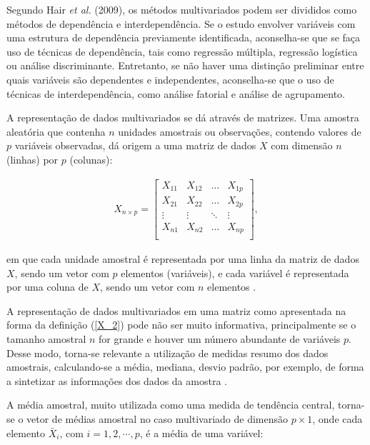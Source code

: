 \documentclass[12pt,a4paper]{article}
\begin{document}
Segundo Hair \textit{et al.} (2009), os métodos multivariados podem ser divididos como métodos de dependência e interdependência. Se o estudo envolver variáveis com uma estrutura de dependência previamente identificada, aconselha-se que se faça uso de técnicas de dependência, tais como regressão múltipla, regressão logística ou análise discriminante. Entretanto, se não haver uma distinção preliminar entre quais variáveis são dependentes e independentes, aconselha-se que o uso de técnicas de interdependência, como análise fatorial e análise de agrupamento.
	
	
A representação de dados multivariados se dá através de matrizes. Uma amostra aleatória que contenha $n$ unidades amostrais ou observações, contendo valores de $p$ variáveis observadas, dá origem a uma matriz de dados $X$ com dimensão $n$ (linhas) por $p$ (colunas):
	
\begin{align}\label{X_2}
    X_{n \times p} =
	\left[
	\begin{array}{cccc}
	    X_{11} & X_{12} & \dots & X_{1p} \\
	    X_{21} & X_{22} & \dots & X_{2p} \\
	    \vdots & \vdots & \ddots & \vdots \\
	    X_{n1} & X_{n2} & \dots & X_{np}\\
	\end{array}
	\right],
\end{align}
	
\noindent em que cada unidade amostral é representada por uma linha da matriz de dados $X$, sendo um vetor com $p$ elementos (variáveis), e cada variável é representada por uma coluna de $X$, sendo um vetor com $n$ elementos \cite{everitt11}.
	
A representação de dados multivariados em uma matriz como apresentada na forma da definição (\ref{X_2}) pode não ser muito informativa, principalmente se o tamanho amostral $n$ for grande e houver um número abundante de variáveis $p$. Desse modo, torna-se relevante a utilização de medidas resumo dos dados amostrais, calculando-se a média, mediana, desvio padrão, por exemplo, de forma a sintetizar as informações dos dados da amostra \cite{ferreira11_g}.  
	
A média amostral, muito utilizada como uma medida de tendência central, torna-se o vetor de médias amostral no caso multivariado de dimensão $p \times 1$, onde cada elemento $\bar{X}_{i}$, com $i = 1,2,\cdots,p $, é a média de uma variável:
	
\end{document}

